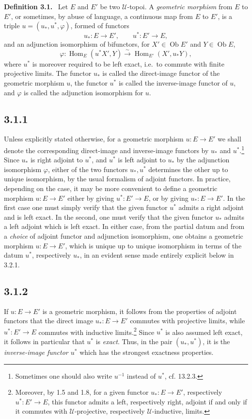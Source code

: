 \documentclass[11pt]{article}
\newcommand{\U}{\mathcal{U}}
\newcommand{\Hom}{\operatorname{Hom}}
\newcommand{\Ob}{\operatorname{Ob}}
\newcommand{\ie}{i.e.}
\newenvironment{statement}[1]{\par\medskip\noindent\textbf{#1.}\ }{\par\medskip}
\begin{document}
\begin{statement}{Definition 3.1}
Let \(E\) and \(E'\) be two \(\U\)-topoi. A \emph{geometric morphism} from \(E\) to \(E'\), or sometimes, by abuse of language, a continuous map from \(E\) to \(E'\), is a triple \(u=(u_\ast,u^\ast,\varphi)\), formed of functors
\[
u_\ast:E\longrightarrow E',\qquad u^\ast:E'\longrightarrow E,
\]
and an adjunction isomorphism of bifunctors, for \(X'\in\Ob E'\) and \(Y\in\Ob E\),
\[
\varphi:\Hom_E(u^\ast X',Y)\xrightarrow{\sim}\Hom_{E'}(X',u_\ast Y),
\]
where \(u^\ast\) is moreover required to be left exact, \ie\ to commute with finite projective limits. The functor \(u_\ast\) is called the direct-image functor of the geometric morphism \(u\), the functor \(u^\ast\) is called the inverse-image functor of \(u\), and \(\varphi\) is called the adjunction isomorphism for \(u\).
\end{statement}

\subsection*{3.1.1}
Unless explicitly stated otherwise, for a geometric morphism \(u:E\to E'\) we shall denote the corresponding direct-image and inverse-image functors by \(u_\ast\) and \(u^\ast\).\footnote{Sometimes one should also write \(u^{-1}\) instead of \(u^\ast\), cf. 13.2.3.} Since \(u_\ast\) is right adjoint to \(u^\ast\), and \(u^\ast\) is left adjoint to \(u_\ast\) by the adjunction isomorphism \(\varphi\), either of the two functors \(u_\ast,u^\ast\) determines the other up to unique isomorphism, by the usual formalism of adjoint functors. In practice, depending on the case, it may be more convenient to define a geometric morphism \(u:E\to E'\) either by giving \(u^\ast:E'\to E\), or by giving \(u_\ast:E\to E'\). In the first case one must simply verify that the given functor \(u^\ast\) admits a right adjoint and is left exact. In the second, one must verify that the given functor \(u_\ast\) admits a left adjoint which is left exact. In either case, from the partial datum and from a \emph{choice} of adjoint functor and adjunction isomorphism, one obtains a geometric morphism \(u:E\to E'\), which is unique up to unique isomorphism in terms of the datum \(u^\ast\), respectively \(u_\ast\), in an evident sense made entirely explicit below in 3.2.1.

\subsection*{3.1.2}
If \(u:E\to E'\) is a geometric morphism, it follows from the properties of adjoint functors that the direct image \(u_\ast:E\to E'\) commutes with projective limits, while \(u^\ast:E'\to E\) commutes with inductive limits.\footnote{Moreover, by 1.5 and 1.8, for a given functor \(u_\ast:E\to E'\), respectively \(u^\ast:E'\to E\), this functor admits a left, respectively right, adjoint if and only if it commutes with \(\U\)-projective, respectively \(\U\)-inductive, limits.} Since \(u^\ast\) is also assumed left exact, it follows in particular that \(u^\ast\) is \emph{exact}. Thus, in the pair \((u_\ast,u^\ast)\), it is the \emph{inverse-image functor \(u^\ast\)} which has the strongest exactness properties.
\end{document}
